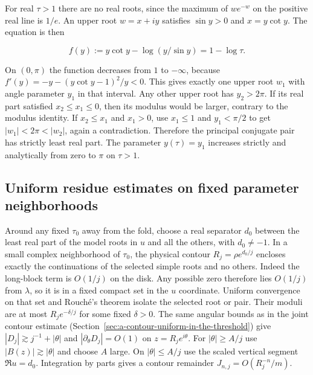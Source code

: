 \documentclass[11pt]{article}
\begin{document}
For real \(\tau>1\) there are no real roots, since the maximum of \(we^{-w}\) on the positive real line is \(1/e\). An upper root \(w=x+iy\) satisfies \(\sin y>0\) and \(x=y\cot y\). The equation is then

\begin{equation*}
f(y):=y\cot y-\log(y/\sin y)=1-\log\tau.
\end{equation*}

On \((0,\pi)\) the function decreases from \(1\) to \(-\infty\), because \(f'(y)=-y-(y\cot y-1)^2/y<0\). This gives exactly one upper root \(w_1\) with angle parameter \(y_1\) in that interval. Any other upper root has \(y_2>2\pi\). If its real part satisfied \(x_2\le x_1\le0\), then its modulus would be larger, contrary to the modulus identity. If \(x_2\le x_1\) and \(x_1>0\), use \(x_1\le1\) and \(y_1<\pi/2\) to get \(|w_1|<2\pi<|w_2|\), again a contradiction. Therefore the principal conjugate pair has strictly least real part. The parameter \(y(\tau)=y_1\) increases strictly and analytically from zero to \(\pi\) on \(\tau>1\).

\subsection{Uniform residue estimates on fixed parameter neighborhoods}
\label{sec:uniform-residue-estimates-on-fixed-parameter-neighborhoods}

Around any fixed \(\tau_0\) away from the fold, choose a real separator \(d_0\) between the least real part of the model roots in \(u\) and all the others, with \(d_0\ne-1\). In a small complex neighborhood of \(\tau_0\), the physical contour \(R_j=\rho e^{d_0/j}\) encloses exactly the continuations of the selected simple roots and no others. Indeed the long-block term is \(O(1/j)\) on the disk. Any possible zero therefore lies \(O(1/j)\) from \(\lambda\), so it is in a fixed compact set in the \(u\) coordinate. Uniform convergence on that set and Rouché's theorem isolate the selected root or pair. Their moduli are at most \(R_j e^{-\delta/j}\) for some fixed \(\delta>0\). The same angular bounds as in the joint contour estimate (Section~\ref{sec:a-contour-uniform-in-the-threshold}) give \(|D_j|\gtrsim j^{-1}+|\theta|\) and \(|\partial_\theta D_j|=O(1)\) on \(z=R_j e^{i\theta}\). For \(|\theta|\ge A/j\) use \(|B(z)|\gtrsim |\theta|\) and choose \(A\) large. On \(|\theta|\le A/j\) use the scaled vertical segment \(\Re u=d_0\). Integration by parts gives a contour remainder \(J_{n,j}=O(R_j^{-n}/m)\).
\end{document}
